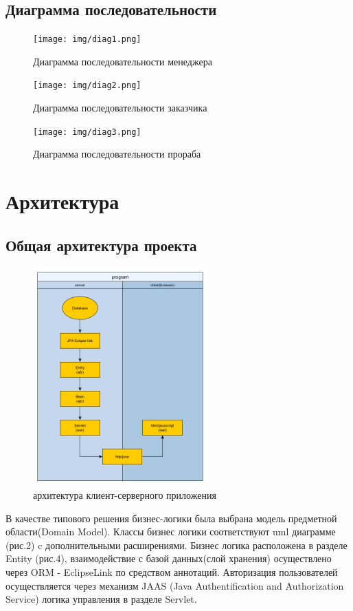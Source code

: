 \subsection{Диаграмма последовательности}
\begin{figure}[!ht]
	\centering
	\texttt{[image: img/diag1.png]}
	\caption{Диаграмма последовательности менеджера}
\end{figure}
\newpage
\begin{figure}[!ht]
	\centering
	\texttt{[image: img/diag2.png]}
	\caption{Диаграмма последовательности заказчика}
\end{figure}
\begin{figure}[!ht]
	\centering
	\texttt{[image: img/diag3.png]}
	\caption{Диаграмма последовательности прораба}
\end{figure}
\newpage
\section{Архитектура}
\subsection{Общая архитектура проекта}
\begin{figure}[!ht]
	\centering
	\includegraphics[width=0.6\textwidth]{img/architecture.png}
	\caption{архитектура клиент-серверного приложения}
\end{figure}

В качестве типового решения бизнес-логики была выбрана модель предметной области(Domain Model). Классы бизнес логики соответствуют uml диаграмме (рис.2) c дополнительными расширениями.
Бизнес логика расположена в разделе Entity (рис.4), взаимодействие с базой данных(слой хранения) осуществлено через ORM - EclipseLink по средством аннотаций. Авторизация пользователей осуществляется через механизм JAAS (Java Authentification and Authorization Service) логика управления в разделе Servlet.
\newpage
